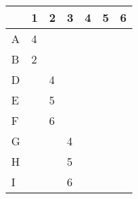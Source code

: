 \begin{tabular}{|l|l|l|l|l|l|l|}
\hline
& 1& 2& 3& 4& 5& 6\\ \hline
A& 4&&&&&\\ \hline
B& 2&&&&&\\ \hline
D&& 4&&&&\\ \hline
E&& 5&&&&\\ \hline
F&& 6&&&&\\ \hline
G&&& 4&&&\\ \hline
H&&& 5&&&\\ \hline
I&&& 6&&&\\ \hline

\end{tabular}
